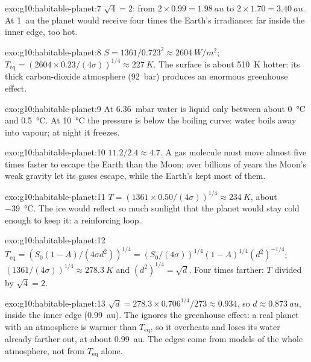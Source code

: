 \begin{solution}{exo:g10:habitable-planet:7}
$\sqrt 4 = 2$: from $2 \times 0.99 = \qty{1.98}{au}$ to $2 \times 1.70 =
\qty{3.40}{au}$. At \qty{1}{au} the planet would receive four times the
Earth's irradiance: far inside the inner edge, too hot.
\end{solution}

\begin{solution}{exo:g10:habitable-planet:8}
$S = 1361/0.723^2 \approx \qty{2604}{W/m^2}$;
$T_{\mathrm{eq}} = (2604 \times 0.23/(4\sigma))^{1/4} \approx \qty{227}{K}$.
The surface is about \qty{510}{K} hotter: its thick carbon-dioxide atmosphere
(\qty{92}{bar}) produces an enormous greenhouse effect.
\end{solution}

\begin{solution}{exo:g10:habitable-planet:9}
At \qty{6.36}{mbar} water is liquid only between about \qty{0}{\degreeCelsius}
and \qty{0.5}{\degreeCelsius}. At \qty{10}{\degreeCelsius} the pressure is
below the boiling curve: water boils away into vapour; at night it freezes.
\end{solution}

\begin{solution}{exo:g10:habitable-planet:10}
$11.2/2.4 \approx 4.7$. A gas molecule must move almost five times faster to
escape the Earth than the Moon; over billions of years the Moon's weak gravity
let its gases escape, while the Earth's kept most of them.
\end{solution}

\begin{solution}{exo:g10:habitable-planet:11}
$T = (1361 \times 0.50/(4\sigma))^{1/4} \approx \qty{234}{K}$, about
\qty{-39}{\degreeCelsius}. The ice would reflect so much sunlight that the
planet would stay cold enough to keep it: a reinforcing loop.
\end{solution}

\begin{solution}{exo:g10:habitable-planet:12}
$T_{\mathrm{eq}} = (S_0(1-A)/(4\sigma d^2))^{1/4} = (S_0/(4\sigma))^{1/4}
(1-A)^{1/4} (d^2)^{-1/4}$; $(1361/(4\sigma))^{1/4} \approx \qty{278.3}{K}$ and
$(d^2)^{1/4} = \sqrt d$. Four times farther: $T$ divided by $\sqrt 4 = 2$.
\end{solution}

\begin{solution}{exo:g10:habitable-planet:13}
$\sqrt d = 278.3 \times 0.706^{1/4}/273 \approx 0.934$, so $d \approx
\qty{0.873}{au}$, inside the inner edge (\qty{0.99}{au}). The  ignores the greenhouse effect: a real planet with an atmosphere
is warmer than $T_{\mathrm{eq}}$, so it overheats and loses its water already
farther out, at about \qty{0.99}{au}. The edges come from models of the whole
atmosphere, not from $T_{\mathrm{eq}}$ alone.
\end{solution}

